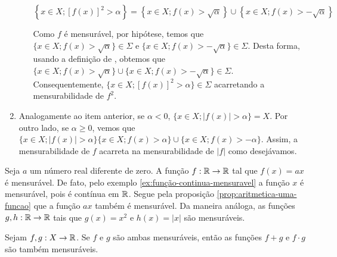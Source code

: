 \begin{prova}
\begin{enumerate}[label*=(\alph*)]
\begin{enumerate}[label = (\roman*)]
                $$\left\{x \in X; [f(x)]^2 > \alpha\right\} = \left\{x \in X; f(x)> \sqrt{\alpha}\right\}\cup \left\{x \in X; f(x)> -\sqrt{\alpha}\right\}$$
                
                Como $f$ é mensurável, por hipótese, temos que $\{x \in X; f(x)> \sqrt{\alpha}\} \in \Sigma$ e \linebreak $\{x \in X; f(x)> -\sqrt{\alpha}\} \in \Sigma$.
                Desta forma, usando a definição de \sigal, obtemos que  $\{x \in X; f(x)> \sqrt{\alpha}\} \cup \{x \in X; f(x)> -\sqrt{\alpha}\} \in \Sigma$. Consequentemente, 
                $\{x \in X; [f(x)]^2 > \alpha\} \in \Sigma$ acarretando a mensurabilidade de $f^2$.
            \end{enumerate}
            
        \item Analogamente ao item anterior, se $\alpha < 0$, $\{x \in X; |f(x)| > \alpha\} = X$.
        Por outro lado, se $\alpha \geq 0$, vemos que 
        $\{x \in X; |f(x)| > \alpha\}\{x \in X; f(x)> \alpha\} \cup \{x \in X; f(x)> -\alpha\}$.
        Assim, a mensurabilidade de $f$ acarreta na mensurabilidade de $|f|$ como desejávamos.
    \end{enumerate}
\end{prova}

\begin{example}
\label{ex:funcao-afim-mensuravel}
    Seja $a$ um número real diferente de zero. 
    A função $f: \mathbb{R} \to \mathbb{R}$ tal que $f(x) = ax$ é mensurável.
    De fato, pelo exemplo \ref{ex:função-continua-mensuravel} a função $x$ é mensurável, pois é contínua em $\mathbb{R}$.
    Segue pela proposição \ref{prop:aritmetica-uma-funcao} que a função $ax$ também é mensurável.
    Da maneira análoga, as funções $g,h: \mathbb{R} \to \mathbb{R}$ tais que $g(x) = x^2$ e $h(x) = |x|$ são mensuráveis.
\end{example}



\begin{proposition}
\label{prop:aritmetica-duas-funcoes}
    Sejam $f,g:X \to \mathbb{R}$. Se $f$ e $g$ são ambas mensuráveis, então as funções $f+g$ e $f\cdot g$ são também mensuráveis.
\end{proposition}

